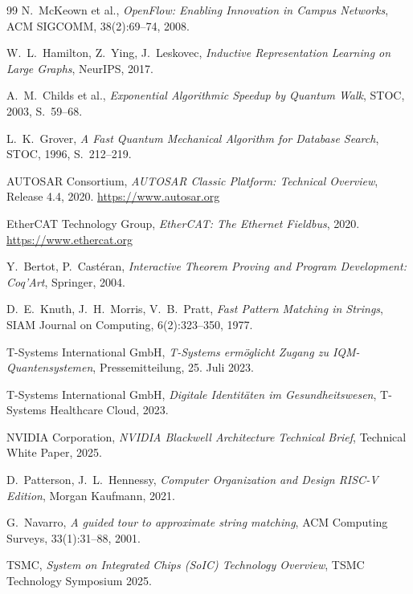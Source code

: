 ﻿\documentclass[a4paper,12pt]{article}
\theoremstyle{definition}
\begin{document}
\begin{thebibliography}{99}
  N.~McKeown et al.,
  \emph{OpenFlow: Enabling Innovation in Campus Networks},
  ACM SIGCOMM, 38(2):69--74, 2008.

  W.~L.~Hamilton, Z.~Ying, J.~Leskovec,
  \emph{Inductive Representation Learning on Large Graphs},
  NeurIPS, 2017.

  A.~M.~Childs et al.,
  \emph{Exponential Algorithmic Speedup by Quantum Walk},
  STOC, 2003, S.~59--68.

  L.~K.~Grover,
  \emph{A Fast Quantum Mechanical Algorithm for Database Search},
  STOC, 1996, S.~212--219.

  AUTOSAR Consortium,
  \emph{AUTOSAR Classic Platform: Technical Overview},
  Release 4.4, 2020. \url{https://www.autosar.org}

  EtherCAT Technology Group,
  \emph{EtherCAT: The Ethernet Fieldbus}, 2020.
  \url{https://www.ethercat.org}

  Y.~Bertot, P.~Cast\'{e}ran,
  \emph{Interactive Theorem Proving and Program Development: Coq'Art},
  Springer, 2004.

  D.~E.~Knuth, J.~H.~Morris, V.~B.~Pratt,
  \emph{Fast Pattern Matching in Strings},
  SIAM Journal on Computing, 6(2):323--350, 1977.

  T-Systems International GmbH,
  \emph{T-Systems erm\"{o}glicht Zugang zu IQM-Quantensystemen},
  Pressemitteilung, 25. Juli 2023.

  T-Systems International GmbH,
  \emph{Digitale Identit\"{a}ten im Gesundheitswesen},
  T-Systems Healthcare Cloud, 2023.

  NVIDIA Corporation,
  \emph{NVIDIA Blackwell Architecture Technical Brief},
  Technical White Paper, 2025.

  D.~Patterson, J.~L.~Hennessy,
  \emph{Computer Organization and Design RISC-V Edition},
  Morgan Kaufmann, 2021.

  G.~Navarro,
  \emph{A guided tour to approximate string matching},
  ACM Computing Surveys, 33(1):31--88, 2001.

  TSMC,
  \emph{System on Integrated Chips (SoIC) Technology Overview},
  TSMC Technology Symposium 2025.


\end{thebibliography}
\end{document}

